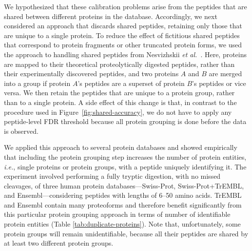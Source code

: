 \documentclass{article}
\begin{document}
We hypothesized that these calibration problems arise from the
peptides that are shared between different proteins in the database.
Accordingly, we next considered an approach that discards shared
peptides, retaining only those that are unique to a single protein.
To reduce the effect of fictitious shared peptides that correspond to
protein fragments or other truncated protein forms, we used the
approach to handling shared peptides from Nesvizhskii {\em et
  al.}~\cite{nesvizhskii2003statistical}. Here, proteins are mapped to
their theoretical proteolytically digested peptides, rather than their
experimentally discovered peptides, and two proteins $A$ and $B$ are
merged into a group if protein $A$'s peptides are a superset of
protein $B$'s peptides or vice versa.  We then retain the peptides
that are unique to a protein group, rather than to a single protein.
A side effect of this change is that, in contrast to the procedure
used in Figure~\ref{fig:shared-accuracy}, we do not have to apply any
peptide-level FDR threshold because all protein grouping is done
before the data is observed.

We applied this approach to several protein databases and showed
empirically that including the protein grouping step increases the
number of protein entities, {\em i.e.}, single proteins or protein
groups, with a peptide uniquely identifying it. The experiment
involved performing a fully tryptic digestion, with no missed
cleavages, of three human protein databases---Swiss-Prot,
Swiss-Prot+TrEMBL, and Ensembl---considering peptides with lengths of
6--50 amino acids. TrEMBL and Ensembl contain many proteoforms and
therefore benefit significantly from this particular protein grouping
approach in terms of number of identifiable protein entities (Table
\ref{tab:duplicate-proteins}). Note that, unfortunately, some protein
groups will remain unidentifiable, because all their peptides are
shared by at least two different protein groups.
\end{document}
